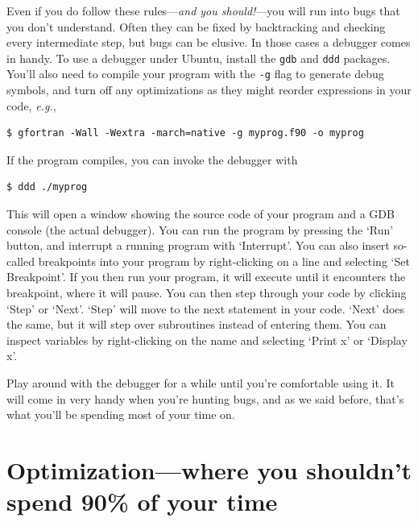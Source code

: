 \documentclass[openany,oneside]{report}
\begin{document}
Even if you do follow these rules---\emph{and you should!}---you will run into bugs that you don't understand.
Often they can be fixed by backtracking and checking every intermediate step, but bugs can be elusive.
In those cases a debugger comes in handy.
To use a debugger under Ubuntu, install the \texttt{gdb} and \texttt{ddd} packages.
You'll also need to compile your program with the \texttt{-g} flag to generate debug symbols, and turn off any optimizations as they might reorder expressions in your code, \emph{e.g.},
\begin{verbatim}
$ gfortran -Wall -Wextra -march=native -g myprog.f90 -o myprog
\end{verbatim}
If the program compiles, you can invoke the debugger with
\begin{verbatim}
$ ddd ./myprog
\end{verbatim}
This will open a window showing the source code of your program and a GDB console (the actual debugger).
You can run the program by pressing the `Run' button, and interrupt a running program with `Interrupt'.
You can also insert so-called breakpoints into your program by right-clicking on a line and selecting `Set Breakpoint'.
If you then run your program, it will execute until it encounters the breakpoint, where it will pause.
You can then step through your code by clicking `Step' or `Next'.
`Step' will move to the next statement in your code.
`Next' does the same, but it will step over subroutines instead of entering them.
You can inspect variables by right-clicking on the name and selecting `Print x' or `Display x'.

Play around with the debugger for a while until you're comfortable using it.
It will come in very handy when you're hunting bugs, and as we said before, that's what you'll be spending most of your time on.

\chapter[Optimization]{Optimization---where you shouldn't spend 90\% of your time}
\label{chap:Optimization}
\end{document}
